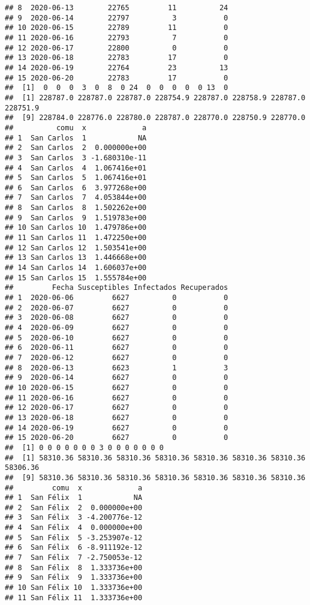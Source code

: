 \documentclass[
]{article}
\begin{document}
\begin{verbatim}
## 8  2020-06-13        22765         11          24
## 9  2020-06-14        22797          3           0
## 10 2020-06-15        22789         11           0
## 11 2020-06-16        22793          7           0
## 12 2020-06-17        22800          0           0
## 13 2020-06-18        22783         17           0
## 14 2020-06-19        22764         23          13
## 15 2020-06-20        22783         17           0
##  [1]  0  0  0  3  0  8  0 24  0  0  0  0  0 13  0
##  [1] 228787.0 228787.0 228787.0 228754.9 228787.0 228758.9 228787.0 228751.9
##  [9] 228784.0 228776.0 228780.0 228787.0 228770.0 228750.9 228770.0
##          comu  x             a
## 1  San Carlos  1            NA
## 2  San Carlos  2  0.000000e+00
## 3  San Carlos  3 -1.680310e-11
## 4  San Carlos  4  1.067416e+01
## 5  San Carlos  5  1.067416e+01
## 6  San Carlos  6  3.977268e+00
## 7  San Carlos  7  4.053844e+00
## 8  San Carlos  8  1.502262e+00
## 9  San Carlos  9  1.519783e+00
## 10 San Carlos 10  1.479786e+00
## 11 San Carlos 11  1.472250e+00
## 12 San Carlos 12  1.503541e+00
## 13 San Carlos 13  1.446668e+00
## 14 San Carlos 14  1.606037e+00
## 15 San Carlos 15  1.555784e+00
##         Fecha Susceptibles Infectados Recuperados
## 1  2020-06-06         6627          0           0
## 2  2020-06-07         6627          0           0
## 3  2020-06-08         6627          0           0
## 4  2020-06-09         6627          0           0
## 5  2020-06-10         6627          0           0
## 6  2020-06-11         6627          0           0
## 7  2020-06-12         6627          0           0
## 8  2020-06-13         6623          1           3
## 9  2020-06-14         6627          0           0
## 10 2020-06-15         6627          0           0
## 11 2020-06-16         6627          0           0
## 12 2020-06-17         6627          0           0
## 13 2020-06-18         6627          0           0
## 14 2020-06-19         6627          0           0
## 15 2020-06-20         6627          0           0
##  [1] 0 0 0 0 0 0 0 3 0 0 0 0 0 0 0
##  [1] 58310.36 58310.36 58310.36 58310.36 58310.36 58310.36 58310.36 58306.36
##  [9] 58310.36 58310.36 58310.36 58310.36 58310.36 58310.36 58310.36
##         comu  x             a
## 1  San Félix  1            NA
## 2  San Félix  2  0.000000e+00
## 3  San Félix  3 -4.200776e-12
## 4  San Félix  4  0.000000e+00
## 5  San Félix  5 -3.253907e-12
## 6  San Félix  6 -8.911192e-12
## 7  San Félix  7 -2.750053e-12
## 8  San Félix  8  1.333736e+00
## 9  San Félix  9  1.333736e+00
## 10 San Félix 10  1.333736e+00
## 11 San Félix 11  1.333736e+00

\end{verbatim}
\end{document}
